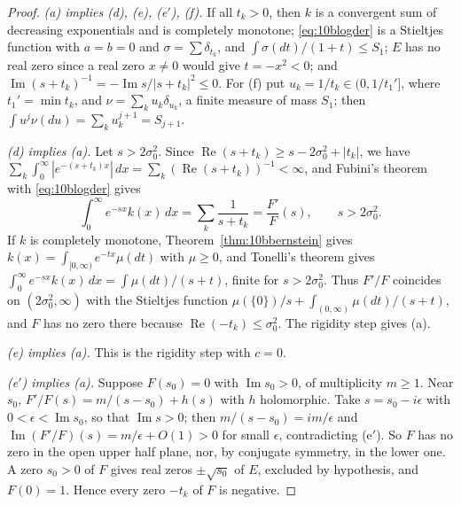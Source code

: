 \begin{proof}
\emph{(a) implies (d), (e), (e$'$), (f).} If all $t_k>0$, then $k$ is a convergent sum of decreasing exponentials and is completely monotone; \eqref{eq:10blogder} is a Stieltjes function with $a=b=0$ and $\sigma = \sum\delta_{t_k}$, and $\int\sigma(dt)/(1+t)\le S_1$; $E$ has no real zero since a real zero $x\ne0$ would give $t = -x^2<0$; and $\operatorname{Im}(s+t_k)^{-1} = -\operatorname{Im}s/|s+t_k|^2\le0$. For (f) put $u_k = 1/t_k\in(0,1/t_1']$, where $t_1' = \min t_k$, and $\nu = \sum_ku_k\delta_{u_k}$, a finite measure of mass $S_1$; then $\int u^j\nu(du) = \sum_ku_k^{j+1} = S_{j+1}$.

\emph{(d) implies (a).} Let $s>2\sigma_0^2$. Since $\operatorname{Re}(s+t_k)\ge s-2\sigma_0^2+|t_k|$, we have $\sum_k\int_0^\infty|e^{-(s+t_k)x}|\,dx = \sum_k(\operatorname{Re}(s+t_k))^{-1}<\infty$, and Fubini's theorem with \eqref{eq:10blogder} gives
\[
\int_0^\infty e^{-sx}k(x)\,dx = \sum_k\frac1{s+t_k} = \frac{F'}F(s),\qquad s>2\sigma_0^2 .
\]
If $k$ is completely monotone, Theorem~\ref{thm:10bbernstein} gives $k(x) = \int_{[0,\infty)}e^{-tx}\mu(dt)$ with $\mu\ge0$, and Tonelli's theorem gives $\int_0^\infty e^{-sx}k(x)\,dx = \int\mu(dt)/(s+t)$, finite for $s>2\sigma_0^2$. Thus $F'/F$ coincides on $(2\sigma_0^2,\infty)$ with the Stieltjes function $\mu(\{0\})/s+\int_{(0,\infty)}\mu(dt)/(s+t)$, and $F$ has no zero there because $\operatorname{Re}(-t_k)\le\sigma_0^2$. The rigidity step gives (a).

\emph{(e) implies (a).} This is the rigidity step with $c=0$.

\emph{(e$'$) implies (a).} Suppose $F(s_0)=0$ with $\operatorname{Im}s_0>0$, of multiplicity $m\ge1$. Near $s_0$, $F'/F(s) = m/(s-s_0)+h(s)$ with $h$ holomorphic. Take $s = s_0-i\epsilon$ with $0<\epsilon<\operatorname{Im}s_0$, so that $\operatorname{Im}s>0$; then $m/(s-s_0) = im/\epsilon$ and $\operatorname{Im}(F'/F)(s) = m/\epsilon+O(1)>0$ for small $\epsilon$, contradicting (e$'$). So $F$ has no zero in the open upper half plane, nor, by conjugate symmetry, in the lower one. A zero $s_0>0$ of $F$ gives real zeros $\pm\sqrt{s_0}$ of $E$, excluded by hypothesis, and $F(0)=1$. Hence every zero $-t_k$ of $F$ is negative.


\end{proof}
